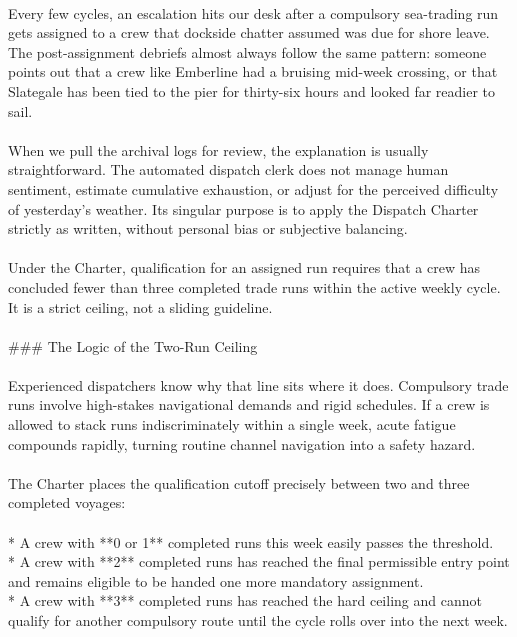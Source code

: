 \documentclass[9pt]{article}
\begin{document}
\begin{minipage}[t]{\textwidth}
\begin{minipage}[t]{0.49\textwidth}
\begin{exbox}
{  \  \\
  Every few cycles, an escalation hits our desk after a compulsory sea-trading run gets assigned to a crew that dockside chatter assumed was due for shore leave. The post-assignment debriefs almost always follow the same pattern: someone points out that a crew like Emberline had a bruising mid-week crossing, or that Slategale has been tied to the pier for thirty-six hours and looked far readier to sail. \\
  \  \\
  When we pull the archival logs for review, the explanation is usually straightforward. The automated dispatch clerk does not manage human sentiment, estimate cumulative exhaustion, or adjust for the perceived difficulty of yesterday's weather. Its singular purpose is to apply the Dispatch Charter strictly as written, without personal bias or subjective balancing. \\
  \  \\
  Under the Charter, qualification for an assigned run requires that a crew has concluded fewer than three completed trade runs within the active weekly cycle. It is a strict ceiling, not a sliding guideline. \\
  \  \\
  \#\#\# The Logic of the Two-Run Ceiling \\
  \  \\
  Experienced dispatchers know why that line sits where it does. Compulsory trade runs involve high-stakes navigational demands and rigid schedules. If a crew is allowed to stack runs indiscriminately within a single week, acute fatigue compounds rapidly, turning routine channel navigation into a safety hazard. \\
  \  \\
  The Charter places the qualification cutoff precisely between two and three completed voyages: \\
  \  \\
  {}* A crew with **0 or 1** completed runs this week easily passes the threshold. \\
  {}* A crew with **2** completed runs has reached the final permissible entry point and remains eligible to be handed one more mandatory assignment. \\
  {}* A crew with **3** completed runs has reached the hard ceiling and cannot qualify for another compulsory route until the cycle rolls over into the next week. \\
  \  \\
}
\end{exbox}
\end{minipage}
\end{minipage}
\end{document}
